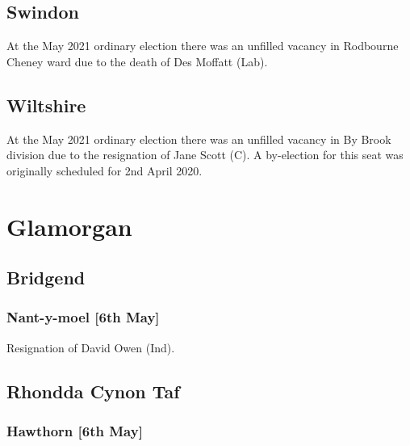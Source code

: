 \documentclass[a4paper,openany]{book}
\begin{document}
\begin{resultsiii}
\subsection*{Swindon}

At the May 2021 ordinary election there was an unfilled vacancy in Rodbourne Cheney ward due to the death of Des Moffatt (Lab).

\subsection*{Wiltshire}

At the May 2021 ordinary election there was an unfilled vacancy in By Brook division due to the resignation of Jane Scott (C).  A by-election for this seat was originally scheduled for 2nd April 2020.

\section{Glamorgan}

\subsection*{Bridgend}

\subsubsection*{Nant-y-moel \hspace*{\fill}\nolinebreak[1]%
	\enspace\hspace*{\fill}
	[6th May]}


Resignation of David Owen (Ind).

\subsection*{Rhondda Cynon Taf}

\subsubsection*{Hawthorn \hspace*{\fill}\nolinebreak[1]%
	\enspace\hspace*{\fill}
	[6th May]}


\end{resultsiii}
\end{document}
